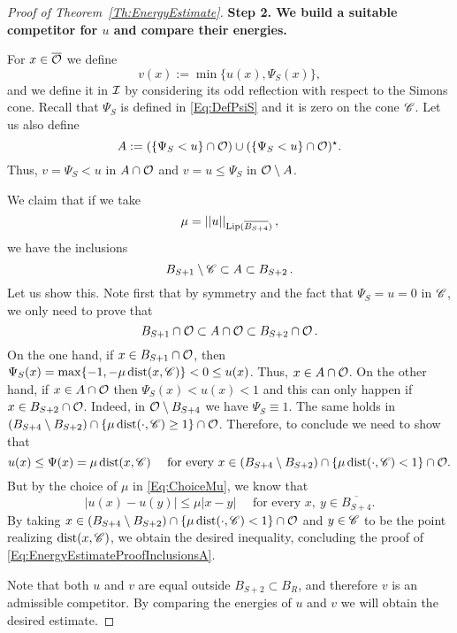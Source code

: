 \begin{proof}[Proof of Theorem~\ref{Th:EnergyEstimate}]
\textbf{Step 2. We build a suitable competitor for $u$ and compare their energies.}

For $x\in \overline{\mathcal{O}}$ we define
$$ 
v(x) := \min\{u(x),\Psi_S(x)\}, 
$$
and we define it in $\mathcal{I}$ by considering its odd reflection with respect to the Simons cone. Recall that $\Psi_S$ is defined in \eqref{Eq:DefPsiS} and it is zero on the cone $\mathscr{C}$. Let us also define
$$
A :=(\{\Psi_S < u\}\cap \mathcal{O}) \cup (\{\Psi_S < u\}\cap \mathcal{O})^\star. 
$$
Thus, $v = \Psi_S < u$ in $A\cap \mathcal{O}$ and $v=u\leq\Psi_S$ in $\mathcal{O} \setminus A$. 

We claim that if we take
\begin{equation}
	\label{Eq:ChoiceMu}
	\mu = \left | \left |{u} \right | \right |_{\mathrm{Lip}(\overline{B_{S+4}})},
\end{equation}
we have the inclusions
\begin{equation}
\label{Eq:EnergyEstimateProofInclusionsA}
	B_{S+1}\setminus \mathscr{C} \subset A \subset B_{S+2}\,.
\end{equation}
Let us show this. Note first that by symmetry and the fact that $\Psi_S = u =0$ in $\mathscr{C}$, we only need to prove that 
$$
	B_{S+1} \cap \mathcal{O}\subset A \cap \mathcal{O}\subset B_{S+2}\cap \mathcal{O}\,.
$$
On the one hand, if $ x\in B_{S+1}\cap \mathcal{O}$, then $\Psi_S(x) = \max\{-1,-\mu\operatorname{dist}(x,\mathscr{C})\} < 0 \leq u(x)$. Thus, $x\in A\cap \mathcal{O}$. On the other hand, if $ x\in A\cap \mathcal{O}$ then $\Psi_S(x) < u(x) < 1$ and this can only happen if $x\in B_{S+2}\cap \mathcal{O}$. Indeed, in $\mathcal{O}\setminus B_{S+4}$ we have $\Psi_S \equiv 1$. The same holds in $(B_{S+4}\setminus B_{S+2})\cap \{\mu \operatorname{dist}(\cdot, \mathscr{C})\geq 1\} \cap \mathcal{O}$. Therefore, to conclude we need to show that 
$$
u(x) \leq \Psi(x) = \mu \operatorname{dist} (x,\mathscr{C}) \quad \text{ for every } x \in (B_{S+4}\setminus B_{S+2})\cap \{\mu \operatorname{dist}(\cdot, \mathscr{C})< 1\} \cap \mathcal{O}.
$$
But by the choice of $\mu$ in \eqref{Eq:ChoiceMu}, we know that
$$
|u(x) - u(y)|\leq \mu |x-y| \quad \text{ for every } x, \ y \in \overline{B_{S+4}}.
$$
By taking $x \in (B_{S+4}\setminus B_{S+2})\cap \{\mu \operatorname{dist}(\cdot, \mathscr{C})< 1\} \cap \mathcal{O}$ and  $y\in \mathscr{C}$ to be the point realizing $\operatorname{dist}(x,\mathscr{C})$, we obtain the desired inequality, concluding the proof of \eqref{Eq:EnergyEstimateProofInclusionsA}.

Note that both $u$ and $v$ are equal outside $B_{S+2} \subset B_R$, and therefore $v$ is an admissible competitor. By comparing the energies of $u$ and $v$ we will obtain the desired estimate. 


\end{proof}
